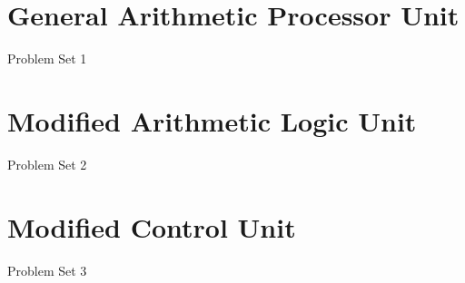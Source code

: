 
\section{{General Arithmetic Processor Unit}}

	{Problem Set 1}

\section{{Modified Arithmetic Logic Unit}}

	{Problem Set 2}

\section{{Modified Control Unit}}

	{Problem Set 3}


